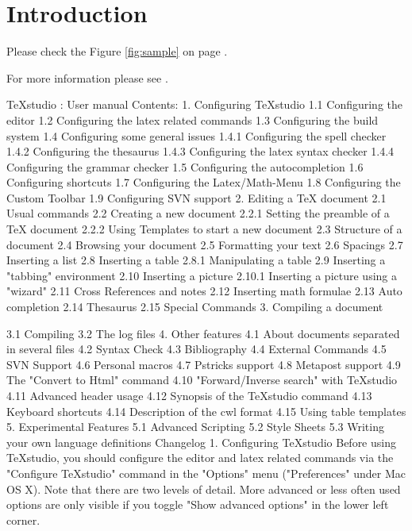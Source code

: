 \documentclass{article}
\begin{document}
	
	
	\section{Introduction}
	\label{sec:intro}
	
	Please check the Figure \ref{fig:sample} on page \pageref{fig:sample}.
	
	
	For more information please see \cite{barrett2006researching, chen2014big}.
	
	TeXstudio : User manual
	Contents:
	1. Configuring TeXstudio
	1.1 Configuring the editor
	1.2 Configuring the latex related commands
	1.3 Configuring the build system
	1.4 Configuring some general issues
	1.4.1 Configuring the spell checker
	1.4.2 Configuring the thesaurus
	1.4.3 Configuring the latex syntax checker
	1.4.4 Configuring the grammar checker
	1.5 Configuring the autocompletion
	1.6 Configuring shortcuts
	1.7 Configuring the Latex/Math-Menu
	1.8 Configuring the Custom Toolbar
	1.9 Configuring SVN support
	2. Editing a TeX document
	2.1 Usual commands
	2.2 Creating a new document
	2.2.1 Setting the preamble of a TeX document
	2.2.2 Using Templates to start a new document
	2.3 Structure of a document
	2.4 Browsing your document
	2.5 Formatting your text
	2.6 Spacings
	2.7 Inserting a list
	2.8 Inserting a table
	2.8.1 Manipulating a table
	2.9 Inserting a "tabbing" environment
	2.10 Inserting a picture
	2.10.1 Inserting a picture using a "wizard"
	2.11 Cross References and notes
	2.12 Inserting math formulae
	2.13 Auto completion
	2.14 Thesaurus
	2.15 Special Commands
	3. Compiling a document
	
	
	
	
	
	3.1 Compiling
	3.2 The log files
	4. Other features
	4.1 About documents separated in several files
	4.2 Syntax Check
	4.3 Bibliography
	4.4 External Commands
	4.5 SVN Support
	4.6 Personal macros
	4.7 Pstricks support
	4.8 Metapost support
	4.9 The "Convert to Html" command
	4.10 "Forward/Inverse search" with TeXstudio
	4.11 Advanced header usage
	4.12 Synopsis of the TeXstudio command
	4.13 Keyboard shortcuts
	4.14 Description of the cwl format
	4.15 Using table templates
	5. Experimental Features
	5.1 Advanced Scripting
	5.2 Style Sheets
	5.3 Writing your own language definitions
	Changelog
	1. Configuring TeXstudio
	Before using TeXstudio, you should configure the editor and latex related commands via the "Configure TeXstudio" command in the "Options" menu ("Preferences" under Mac OS X). Note that there are two levels of detail. More advanced or less often used options are only visible if you toggle "Show advanced options" in the lower left corner.
	
\end{document}
